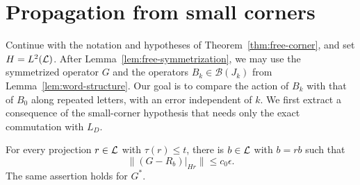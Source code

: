\section{Propagation from small corners}
\label{sec:propagation}

Continue with the notation and hypotheses of Theorem~\ref{thm:free-corner},
and set $H=L^2(\mathcal L)$. After Lemma~\ref{lem:free-symmetrization}, we may use
the symmetrized operator $G$ and the operators $B_k\in\mathcal B(J_k)$
from Lemma~\ref{lem:word-structure}. Our goal is to compare the action of
$B_k$ with that of $B_0$ along repeated letters, with an error independent
of $k$. We first extract a consequence of the small-corner hypothesis
that needs only the exact commutation with $L_D$.

\begin{lemma}
\label{lem:full-column}
For every projection $r\in\mathcal L$ with $\tau(r)\le t$, there is $b\in\mathcal L$
with $b=rb$ such that
\begin{equation}
  \big\|(G-R_b)|_{Hr}\big\|\le c_0\epsilon.
  \label{eq:full-column}
\end{equation}
The same assertion holds for $G^*$.
\end{lemma}


